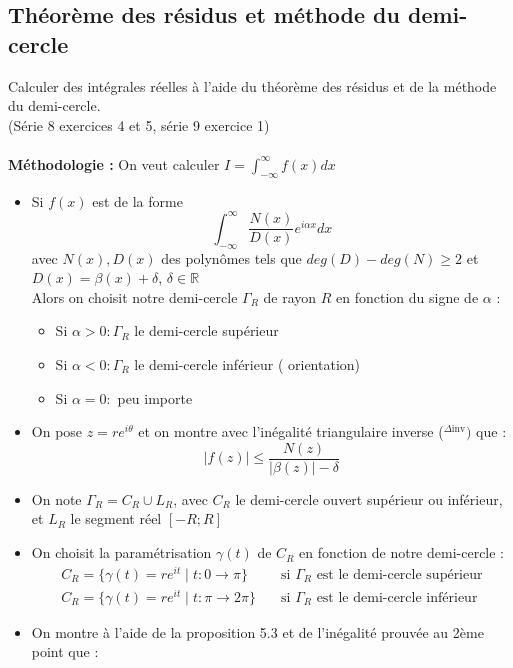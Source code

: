 \subsection{Théorème des résidus et méthode du demi-cercle}
Calculer des intégrales réelles à l’aide du théorème des résidus et de la méthode du demi-cercle. \\
(Série 8 exercices 4 et 5, série 9 exercice 1) \\
\\ 
\textbf{Méthodologie :} On veut calculer $I = \int_{-\infty}^{\infty} f(x) dx$
\begin{itemize}
    \item Si $f(x)$ est de la forme 
    $$\int_{-\infty}^{\infty}\frac{N(x)}{D(x)}e^{i\alpha x} dx$$
    avec $N(x), D(x)$ des polynômes tels que $deg(D)-deg(N) \geq 2$ et $D(x) = \beta(x) + \delta$, $\delta \in \mathbb{R}$\\
    Alors on choisit notre demi-cercle $\Gamma_R$ de rayon $R$ en fonction du signe de $\alpha$ :
    \begin{itemize}
        \item Si $\alpha > 0 : \Gamma_R$ le demi-cercle supérieur
        \item Si $\alpha < 0 : \Gamma_R$ le demi-cercle inférieur (\faExclamationTriangle\hspace{1pt} orientation)
        \item Si $\alpha = 0 :$ peu importe
    \end{itemize}
    \item On pose $z = re^{i\theta}$ et on montre avec l'inégalité triangulaire inverse ($^{\Delta \text{inv}})$ que :
    $$|f(z)| \leq \frac{N(z)}{|\beta(z)| - \delta}$$
    \item On note $\Gamma_R = C_R \cup L_R$, avec $C_R$ le demi-cercle ouvert supérieur ou inférieur, et $L_R$ le segment réel $[-R;R]$
    \item On choisit la paramétrisation $\gamma(t)$ de $C_R$ en fonction de notre demi-cercle :
    \begin{align*}
        C_R = \{\gamma(t) = re^{it} \mid t : 0 \to \pi\} \quad &\text{si } \Gamma_R \text{ est le demi-cercle supérieur} \\
        C_R = \{\gamma(t) = re^{it} \mid t : \pi \to 2\pi\} \quad &\text{si } \Gamma_R \text{ est le demi-cercle inférieur}
    \end{align*}
    \item On montre à l'aide de la proposition 5.3 et de l'inégalité prouvée au 2ème point que :

\end{itemize}
